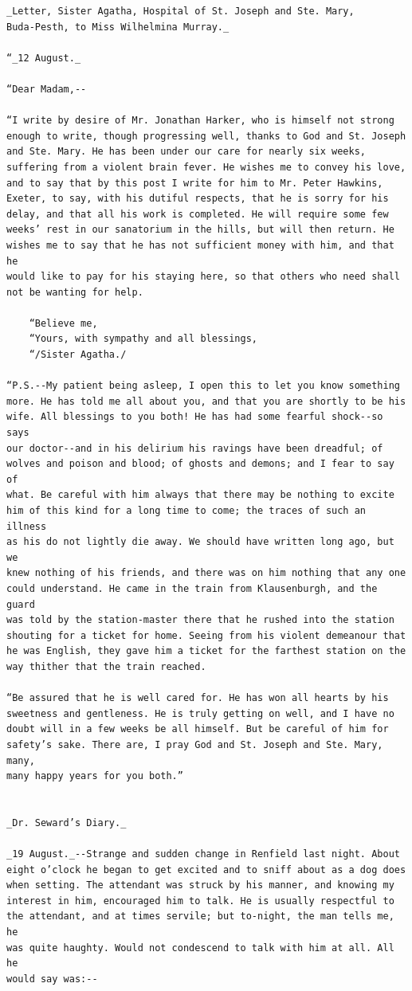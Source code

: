 \documentclass{article}
\begin{document}
\begin{verbatim}
_Letter, Sister Agatha, Hospital of St. Joseph and Ste. Mary,
Buda-Pesth, to Miss Wilhelmina Murray._

“_12 August._

“Dear Madam,--

“I write by desire of Mr. Jonathan Harker, who is himself not strong
enough to write, though progressing well, thanks to God and St. Joseph
and Ste. Mary. He has been under our care for nearly six weeks,
suffering from a violent brain fever. He wishes me to convey his love,
and to say that by this post I write for him to Mr. Peter Hawkins,
Exeter, to say, with his dutiful respects, that he is sorry for his
delay, and that all his work is completed. He will require some few
weeks’ rest in our sanatorium in the hills, but will then return. He
wishes me to say that he has not sufficient money with him, and that he
would like to pay for his staying here, so that others who need shall
not be wanting for help.

    “Believe me,
    “Yours, with sympathy and all blessings,
    “/Sister Agatha./

“P.S.--My patient being asleep, I open this to let you know something
more. He has told me all about you, and that you are shortly to be his
wife. All blessings to you both! He has had some fearful shock--so says
our doctor--and in his delirium his ravings have been dreadful; of
wolves and poison and blood; of ghosts and demons; and I fear to say of
what. Be careful with him always that there may be nothing to excite
him of this kind for a long time to come; the traces of such an illness
as his do not lightly die away. We should have written long ago, but we
knew nothing of his friends, and there was on him nothing that any one
could understand. He came in the train from Klausenburgh, and the guard
was told by the station-master there that he rushed into the station
shouting for a ticket for home. Seeing from his violent demeanour that
he was English, they gave him a ticket for the farthest station on the
way thither that the train reached.

“Be assured that he is well cared for. He has won all hearts by his
sweetness and gentleness. He is truly getting on well, and I have no
doubt will in a few weeks be all himself. But be careful of him for
safety’s sake. There are, I pray God and St. Joseph and Ste. Mary, many,
many happy years for you both.”


_Dr. Seward’s Diary._

_19 August._--Strange and sudden change in Renfield last night. About
eight o’clock he began to get excited and to sniff about as a dog does
when setting. The attendant was struck by his manner, and knowing my
interest in him, encouraged him to talk. He is usually respectful to
the attendant, and at times servile; but to-night, the man tells me, he
was quite haughty. Would not condescend to talk with him at all. All he
would say was:--


\end{verbatim}
\end{document}
